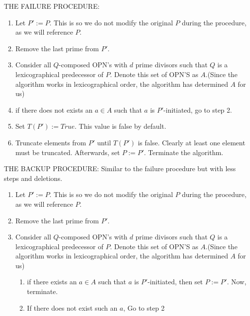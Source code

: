 \documentclass[../paper.tex]{subfiles}
\begin{document}
THE FAILURE PROCEDURE:

\begin{enumerate}[label*=\arabic*.]

  \item Let $P' := P$. This is so we do not modify the original
        $P$ during the procedure, as we will reference $P$.  

  \item Remove the last prime from $P'$.

  \item \label{fail_loop}
        Consider all $Q$-composed OPN's with $d$ prime divisors such
        that $Q$ is a lexicographical predecessor of $P$. Denote
        this set of OPN'S as $A$.(Since the algorithm works in
        lexicographical order, the algorithm has determined $A$
        for us) 

  \item if there does not exists an $a \in A$ such that $a$ is
    $P'$-initiated, go to step 2.

  \item Set $T(P') := True$. This value is false by default.

  \item Truncate elements from $P'$ until $T(P')$ is false.
        Clearly at least one element must be truncated.
        Afterwards, set $P := P'$. Terminate the algorithm.
\end{enumerate}

THE BACKUP PROCEDURE: Similar to the failure procedure but with
less steps and deletions.

\begin{enumerate}[label*=\arabic*.]

  \item Let $P' := P$. This is so we do not modify the original
        $P$ during the procedure, as we will reference $P$.  

  \item Remove the last prime from $P'$.

  \item \label{fail_loop}
        Consider all $Q$-composed OPN's with $d$ prime divisors such
        that $Q$ is a lexicographical predecessor of $P$. Denote
        this set of OPN'S as $A$.(Since the algorithm works in
        lexicographical order, the algorithm has determined $A$
        for us)

  \begin{enumerate}[label*=\arabic*.]

    \item if there exists an $a \in A$ such that $a$ is
    $P'$-initiated, then set $P := P'$. Now, terminate.

    \item If there does not exist such an $a$, Go to step 2 %

  \end{enumerate}

\end{enumerate}
\end{document}
